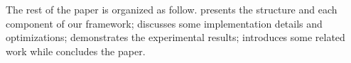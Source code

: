 The rest of the paper is organized as follow.
 presents the structure and each component of our
framework;
 discusses some implementation
details and optimizations;
 demonstrates the experimental results;
 introduces some related work while
 concludes the paper.


